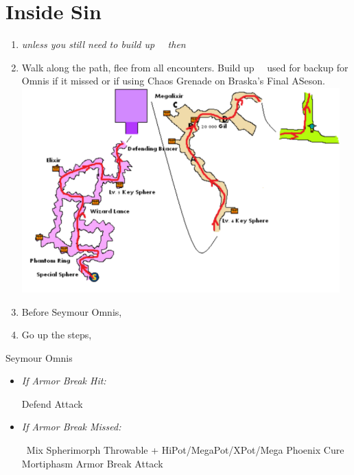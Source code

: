 \chapter{Inside Sin}
\begin{enumerate}
  \item \formation{\tidus}{\auron}{\kimahri} \textit{unless you still need to build up \rikku\ \od\, then} \formation{\tidus}{\auron}{\rikku}
  \item Walk along the path, flee from all encounters. Build up \rikku\ \od\, used for backup for Omnis if it missed or if using Chaos Grenade on Braska's Final ASeson.
        \includegraphics{graphics/sinpath}
  \item Before Seymour Omnis, \formation{\tidus}{\auron}{\yuna}
  \item Go up the steps, \sd
\end{enumerate}
\begin{battle}[80000]{Seymour Omnis}
  \begin{itemize}
    \yunaf Defend
    \tidusf Armor Break
    \item \textit{If Armor Break Hit:}
          \begin{itemize}
            \auronf Defend
            \summon{\bahamut}
            \bahamutf Attack
          \end{itemize}
    \item \textit{If Armor Break Missed:}
          \begin{itemize}
            \switch{\auron}{\rikku}
            \rikkuf \od\ Mix Spherimorph Throwable + HiPot/MegaPot/XPot/Mega Phoenix
            \yunaf Cure Mortiphasm
            \tidusf Armor Break
            \summon{\bahamut}
            \bahamutf Attack
          \end{itemize}
  \end{itemize}
\end{battle}
